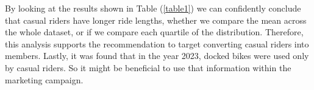 \documentclass[12pt]{article}
\begin{document}
By looking at the results shown in Table (\ref{table1}) we can confidently conclude that casual riders have longer ride lengths, whether we compare the mean across the whole dataset, or if we compare each quartile of the distribution. Therefore, this analysis supports the recommendation to target converting casual riders into members. Lastly, it was found that in the year 2023, docked bikes were used only by casual riders. So it might be beneficial to use that information within the marketing campaign.
\end{document}
